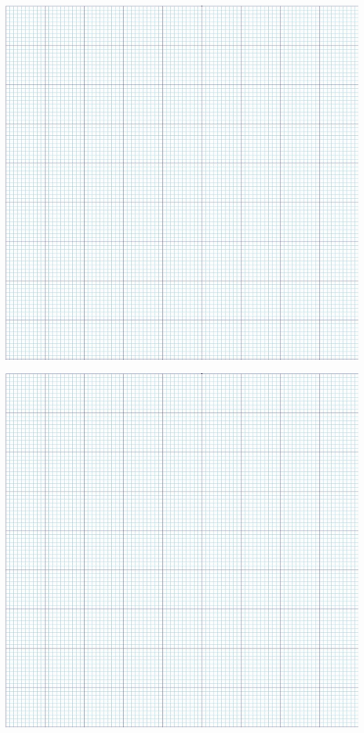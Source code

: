 \begin{center}
\begin{minipage}{0.49\linewidth}
	\includegraphics[width=\linewidth]{img/rep4}
\end{minipage}\hfill
\begin{minipage}{0.49\linewidth}
	\includegraphics[width=\linewidth]{img/rep4}
\end{minipage}
\end{center}

